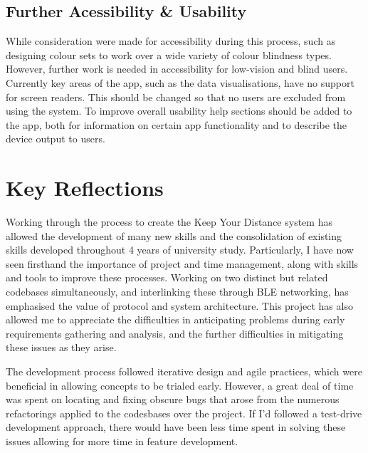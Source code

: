 \documentclass{l4proj}
\begin{document}
\subsection{Further Acessibility \& Usability}

While consideration were made for accessibility during this process, such as designing colour sets to work over a wide variety of colour blindness types. However, further work is needed in accessibility for low-vision and blind users. Currently key areas of the app, such as the data visualisations, have no support for screen readers. This should be changed so that no users are excluded from using the system. To improve overall usability help sections should be added to the app, both for information on certain app functionality and to describe the device output to users.

\section{Key Reflections}

Working through the process to create the Keep Your Distance system has allowed the development of many new skills and the consolidation of existing skills developed throughout 4 years of university study. Particularly, I have now seen firsthand the importance of project and time management, along with skills and tools to improve these processes. Working on two distinct but related codebases simultaneously, and interlinking these through BLE networking, has emphasised the value of protocol and system architecture. This project has also allowed me to appreciate the difficulties in anticipating problems during early requirements gathering and analysis, and the further difficulties in mitigating these issues as they arise.

The development process followed iterative design and agile practices, which were beneficial in allowing concepts to be trialed early. However, a great deal of time was spent on locating and fixing obscure bugs that arose from the numerous refactorings applied to the codesbases over the project. If I'd followed a test-drive development approach, there would have been less time spent in solving these issues allowing for more time in feature development.

%
% 
\end{document}

